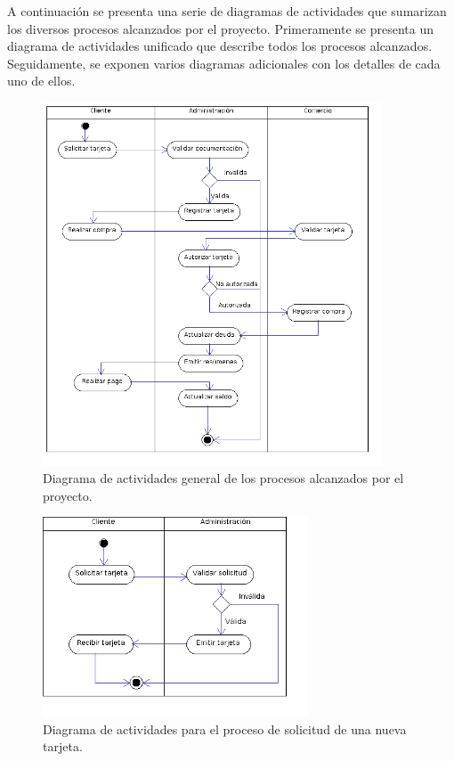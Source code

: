 A continuación se presenta una serie de diagramas de actividades que sumarizan
los diversos procesos alcanzados por el proyecto. Primeramente se presenta un
diagrama de actividades unificado que describe todos los procesos alcanzados.
Seguidamente, se exponen varios diagramas adicionales con los detalles de cada
uno de ellos.

\begin{figure}[htb]
\begin{center}
\includegraphics[width=0.9\textwidth]{images/mod_negocio_act_global.png}
\end{center}
\caption{Diagrama de actividades general de los procesos alcanzados por el
proyecto.}
\end{figure}

\begin{figure}[htb]
\begin{center}
\includegraphics[width=0.7\textwidth]{images/mod_negocio_act_solicitudtarjeta.png}
\end{center}
\caption{Diagrama de actividades para el proceso de solicitud de una nueva
tarjeta.}
\end{figure}

